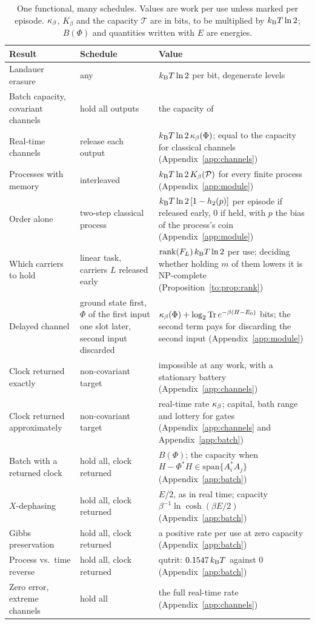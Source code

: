 \begin{table}[tbp]
\centering
\small
\begin{tabular}{>{\raggedright\arraybackslash}p{4.0cm}>{\raggedright\arraybackslash}p{3.2cm}>{\raggedright\arraybackslash}p{6.2cm}}
\toprule
Result & Schedule & Value\\
\midrule
Landauer erasure~\cite{Landauer61} & any & $k_{\mathrm B} T\ln2$ per bit, degenerate levels\\
Batch capacity, covariant channels & hold all outputs & the capacity of~\cite{FBB21}\\
Real-time channels & release each output & $k_{\mathrm B} T\ln2\,\kappa_\beta(\Phi)$; equal to the capacity for classical channels (Appendix~\ref{app:channels})\\
Processes with memory & interleaved & $k_{\mathrm B} T\ln2\,K_\beta(\mathcal P)$ for every finite process (Appendix~\ref{app:module})\\
Order alone & two-step classical process & $k_{\mathrm B} T\ln2\,[1-h_2(p)]$ per episode if released early, $0$ if held, with $p$ the bias of the process's coin (Appendix~\ref{app:module})\\
Which carriers to hold & linear task, carriers $L$ released early & $\operatorname{rank}(F_L)\,k_{\mathrm B} T\ln2$ per use; deciding whether holding $m$ of them lowers it is NP-complete (Proposition~\ref{to:prop:rank})\\
Delayed channel & ground state first, $\Phi$ of the first input one slot later, second input discarded & $\kappa_\beta(\Phi)+\log_2\operatorname{Tr} e^{-\beta(H-E_0)}$ bits; the second term pays for discarding the second input (Appendix~\ref{app:module})\\
Clock returned exactly & non-covariant target & impossible at any work, with a stationary battery (Appendix~\ref{app:channels})\\
Clock returned approximately & non-covariant target & real-time rate $\kappa_\beta$; capital, bath range and lottery for gates (Appendix~\ref{app:channels} and Appendix~\ref{app:batch})\\
Batch with a returned clock & hold all, clock returned & $B(\Phi)$; the capacity when $H-\Phi^*H\in\mathrm{span}\{A_i^*A_j\}$ (Appendix~\ref{app:batch})\\
$X$-dephasing & hold all, clock returned & $E/2$, as in real time; capacity $\beta^{-1}\ln\cosh(\beta E/2)$ (Appendix~\ref{app:batch})\\
Gibbs preservation & hold all, clock returned & a positive rate per use at zero capacity (Appendix~\ref{app:batch})\\
Process vs.\ time reverse & hold all, clock returned & qutrit: $0.1547\,k_{\mathrm B} T$ against $0$ (Appendix~\ref{app:batch})\\
Zero error, extreme channels & hold all & the full real-time rate (Appendix~\ref{app:channels})\\
\bottomrule
\end{tabular}
\caption{One functional, many schedules. Values are work per use unless marked per episode. $\kappa_\beta$, $K_\beta$ and the capacity $\mathcal T$ are in bits, to be multiplied by $k_{\mathrm B} T\ln2$; $B(\Phi)$ and quantities written with $E$ are energies.}\label{to:tab:corollaries}
\end{table}

